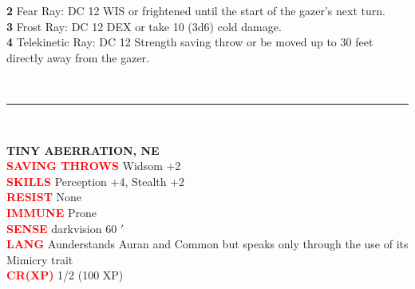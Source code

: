 \documentclass{article}
\begin{document}
\begin{adjustbox}{minipage=0.45\textwidth, margin=\fboxsep, bgimage=../images/texture2.pdf}
{\begin{minipage}[t][10.5in][t]{0.9\textwidth}
\begin{minipage}[t]{0.7\textwidth}
			\textbf{2} Fear Ray: DC 12 WIS or frightened until the start of the gazer's next turn. \\
			\textbf{3} Frost Ray: DC 12 DEX or take 10 (3d6) cold damage. \\
			\textbf{4} Telekinetic Ray: DC 12 Strength saving throw or be moved up to 30 feet directly away from the gazer. 
        \end{minipage}
        \vspace{0.025in}\\
        \rule{\textwidth}{1pt}\\
        \vspace{-0.08in}
        \begin{flushleft}
            {\large\textbf{TINY ABERRATION, NE}}\\
            \textcolor{red}{\textbf{SAVING THROWS}} Widsom +2  \\
            \textcolor{red}{\textbf{SKILLS}} Perception +4, Stealth +2 \\
            \textcolor{red}{\textbf{RESIST}} None \\
            \textcolor{red}{\textbf{IMMUNE}} Prone\\
            \textcolor{red}{\textbf{SENSE}} darkvision 60 $'$\\
            \textcolor{red}{\textbf{LANG}} Aunderstands Auran and Common but speaks only through the use of its Mimicry trait\\
            \textcolor{red}{\textbf{CR(XP)}}  1/2 (100 XP)\\
        \end{flushleft}
        \end{minipage}
	}
\end{adjustbox}

\pagebreak
\end{document}
